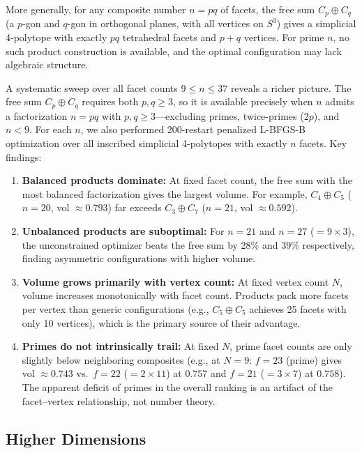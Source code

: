 \documentclass[11pt]{article}
\begin{document}
More generally, for any composite number $n = pq$ of facets,
the free sum $C_p \oplus C_q$ (a $p$-gon and $q$-gon in orthogonal
planes, with all vertices on $S^3$) gives a simplicial 4-polytope
with exactly $pq$ tetrahedral facets and $p + q$ vertices.
For prime $n$, no such product construction is available, and the
optimal configuration may lack algebraic structure.

A systematic sweep over all facet counts $9 \leq n \leq 37$ reveals a
richer picture.  The free sum $C_p \oplus C_q$ requires both $p, q \geq 3$,
so it is available precisely when $n$ admits a factorization $n = pq$ with
$p, q \geq 3$---excluding primes, twice-primes ($2p$), and $n < 9$.
For each $n$, we also performed 200-restart penalized L-BFGS-B optimization
over all inscribed simplicial 4-polytopes with exactly $n$ facets.
Key findings:

\begin{enumerate}[label=(\roman*)]
\item \textbf{Balanced products dominate:} At fixed facet count, the free
      sum with the most balanced factorization gives the largest volume.
      For example, $C_4 \oplus C_5$ ($n = 20$, vol $\approx 0.793$) far exceeds
      $C_3 \oplus C_7$ ($n = 21$, vol $\approx 0.592$).
\item \textbf{Unbalanced products are suboptimal:} For $n = 21$ and $n = 27$
      ($= 9 \times 3$), the unconstrained optimizer beats the free sum
      by 28\% and 39\% respectively, finding asymmetric configurations
      with higher volume.
\item \textbf{Volume grows primarily with vertex count:} At fixed vertex
      count $N$, volume increases monotonically with facet count.
      Products pack more facets per vertex than generic configurations
      (e.g., $C_5 \oplus C_5$ achieves 25 facets with only 10 vertices),
      which is the primary source of their advantage.
\item \textbf{Primes do not intrinsically trail:} At fixed $N$,
      prime facet counts are only slightly below neighboring composites
      (e.g., at $N = 9$: $f = 23$ (prime) gives vol $\approx 0.743$
      vs.\ $f = 22$ ($= 2 \times 11$) at $0.757$ and
      $f = 21$ ($= 3 \times 7$) at $0.758$).
      The apparent deficit of primes in the overall ranking is an artifact
      of the facet--vertex relationship, not number theory.
\end{enumerate}

\subsection{Higher Dimensions}
\end{document}

